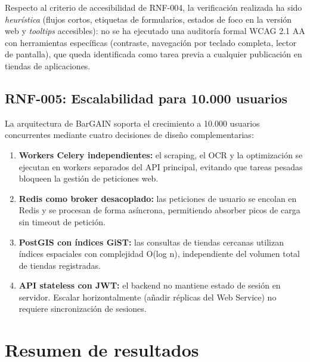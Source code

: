 Respecto al criterio de accesibilidad de RNF-004, la verificaci\'on realizada ha sido
\emph{heur\'istica} (flujos cortos, etiquetas de formularios, estados de foco en la versi\'on
web y \emph{tooltips} accesibles): no se ha ejecutado una auditor\'ia formal WCAG 2.1 AA
\cite{wcag21} con herramientas espec\'ificas (contraste, navegaci\'on por teclado completa,
lector de pantalla), que queda identificada como tarea previa a cualquier publicaci\'on en
tiendas de aplicaciones.

\subsection{RNF-005: Escalabilidad para 10.000 usuarios}\label{subsec:rnf05}

La arquitectura de BarGAIN soporta el crecimiento a 10.000 usuarios concurrentes mediante cuatro
decisiones de dise\~no complementarias:

\begin{enumerate}
  \item \textbf{Workers Celery independientes:} el scraping, el OCR y la optimizaci\'on se ejecutan
    en workers separados del API principal, evitando que tareas pesadas bloqueen la gesti\'on de
    peticiones web.

  \item \textbf{Redis como broker desacoplado:} las peticiones de usuario se encolan en Redis y se
    procesan de forma as\'incrona, permitiendo absorber picos de carga sin timeout de petici\'on.

  \item \textbf{PostGIS con \'indices GiST:} las consultas de tiendas cercanas utilizan \'indices
    espaciales con complejidad O(log n), independiente del volumen total de tiendas registradas.

  \item \textbf{API stateless con JWT:} el backend no mantiene estado de sesi\'on en servidor.
    Escalar horizontalmente (a\~nadir r\'eplicas del Web Service) no requiere sincronizaci\'on de
    sesiones.
\end{enumerate}

\section{Resumen de resultados}\label{sec:resumen-pruebas}

